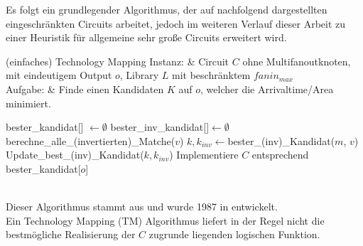 \documentclass[11pt, a4paper, german]{article}
\newcommand{\TM}{Technology  Mapping }
\begin{document}
Es folgt ein grundlegender Algorithmus, der auf nachfolgend dargestellten eingeschränkten Circuits arbeitet, jedoch im weiteren Verlauf dieser Arbeit zu einer Heuristik für allgemeine sehr große Circuits erweitert wird.

\begin{problem}[framed]{(einfaches) Technology Mapping}
  Instanz:  & Circuit $C$ ohne Multifanoutknoten, mit eindeutigem Output $o$, Library $L$ mit beschr\"anktem $fanin_{max}$\\
  Aufgabe: &  Finde einen Kandidaten $K$ auf $o$, welcher die Arrivaltime/Area minimiert.
\end{problem}
\begin{algorithm}[H]
 \LinesNumbered
 \DontPrintSemicolon
 \caption{(einfaches) Technology Mapping}

 bester\_kandidat[] $\gets \emptyset$\;
 bester\_inv\_kandidat[]$ \gets \emptyset$\;
 {
   berechne\_alle\_(invertierten)\_Matche($v$)\;
   {
      $k,k_{inv} \gets $bester\_(inv)\_Kandidat($m$, $v$)\;
      Update\_best\_(inv)\_Kandidat($k,k_{inv}$)\;
   }
 }
 Implementiere $C$ entsprechend bester\_kandidat[$o$]\;
\end{algorithm}\ \\

Dieser Algorithmus stammt aus \cite{Elbert} und wurde 1987 in \cite{DAGON} entwickelt.\\
Ein \TM (TM) Algorithmus liefert in der Regel nicht die bestmögliche Realisierung der $C$ zugrunde liegenden logischen Funktion.\\
\end{document}
